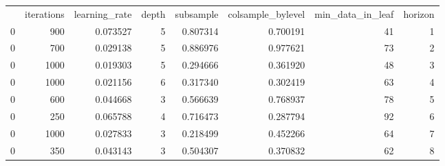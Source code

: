 \begin{tabular}{lrrrrrrr}
 & iterations & learning_rate & depth & subsample & colsample_bylevel & min_data_in_leaf & horizon \\
0 & 900 & 0.073527 & 5 & 0.807314 & 0.700191 & 41 & 1 \\
0 & 700 & 0.029138 & 5 & 0.886976 & 0.977621 & 73 & 2 \\
0 & 1000 & 0.019303 & 5 & 0.294666 & 0.361920 & 48 & 3 \\
0 & 1000 & 0.021156 & 6 & 0.317340 & 0.302419 & 63 & 4 \\
0 & 600 & 0.044668 & 3 & 0.566639 & 0.768937 & 78 & 5 \\
0 & 250 & 0.065788 & 4 & 0.716473 & 0.287794 & 92 & 6 \\
0 & 1000 & 0.027833 & 3 & 0.218499 & 0.452266 & 64 & 7 \\
0 & 350 & 0.043143 & 3 & 0.504307 & 0.370832 & 62 & 8 \\
\end{tabular}
